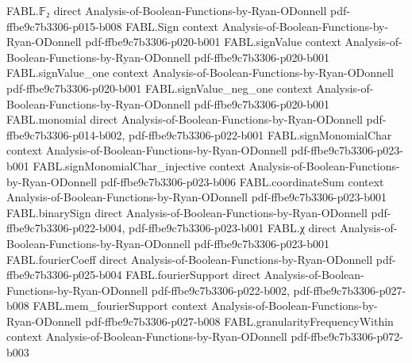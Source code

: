 \begin{theorem}
\label{FABL.exactlyThreeTseitin_eval_iff_exists}
\leanok
{}
\proofstep
  {FABL.𝔽₂}
  {direct}
  {Analysis-of-Boolean-Functions-by-Ryan-ODonnell}
  {pdf-ffbe9c7b3306-p015-b008}
\proofstep
  {FABL.Sign}
  {context}
  {Analysis-of-Boolean-Functions-by-Ryan-ODonnell}
  {pdf-ffbe9c7b3306-p020-b001}
\proofstep
  {FABL.signValue}
  {context}
  {Analysis-of-Boolean-Functions-by-Ryan-ODonnell}
  {pdf-ffbe9c7b3306-p020-b001}
\proofstep
  {FABL.signValue_one}
  {context}
  {Analysis-of-Boolean-Functions-by-Ryan-ODonnell}
  {pdf-ffbe9c7b3306-p020-b001}
\proofstep
  {FABL.signValue_neg_one}
  {context}
  {Analysis-of-Boolean-Functions-by-Ryan-ODonnell}
  {pdf-ffbe9c7b3306-p020-b001}
\proofstep
  {FABL.monomial}
  {direct}
  {Analysis-of-Boolean-Functions-by-Ryan-ODonnell}
  {pdf-ffbe9c7b3306-p014-b002,
    pdf-ffbe9c7b3306-p022-b001}
\proofstep
  {FABL.signMonomialChar}
  {context}
  {Analysis-of-Boolean-Functions-by-Ryan-ODonnell}
  {pdf-ffbe9c7b3306-p023-b001}
\proofstep
  {FABL.signMonomialChar_injective}
  {context}
  {Analysis-of-Boolean-Functions-by-Ryan-ODonnell}
  {pdf-ffbe9c7b3306-p023-b006}
\proofstep
  {FABL.coordinateSum}
  {context}
  {Analysis-of-Boolean-Functions-by-Ryan-ODonnell}
  {pdf-ffbe9c7b3306-p023-b001}
\proofstep
  {FABL.binarySign}
  {direct}
  {Analysis-of-Boolean-Functions-by-Ryan-ODonnell}
  {pdf-ffbe9c7b3306-p022-b004,
    pdf-ffbe9c7b3306-p023-b001}
\proofstep
  {FABL.χ}
  {direct}
  {Analysis-of-Boolean-Functions-by-Ryan-ODonnell}
  {pdf-ffbe9c7b3306-p023-b001}
\proofstep
  {FABL.fourierCoeff}
  {direct}
  {Analysis-of-Boolean-Functions-by-Ryan-ODonnell}
  {pdf-ffbe9c7b3306-p025-b004}
\proofstep
  {FABL.fourierSupport}
  {direct}
  {Analysis-of-Boolean-Functions-by-Ryan-ODonnell}
  {pdf-ffbe9c7b3306-p022-b002,
    pdf-ffbe9c7b3306-p027-b008}
\proofstep
  {FABL.mem_fourierSupport}
  {context}
  {Analysis-of-Boolean-Functions-by-Ryan-ODonnell}
  {pdf-ffbe9c7b3306-p027-b008}
\proofstep
  {FABL.granularityFrequencyWithin}
  {context}
  {Analysis-of-Boolean-Functions-by-Ryan-ODonnell}
  {pdf-ffbe9c7b3306-p072-b003}

\end{theorem}
